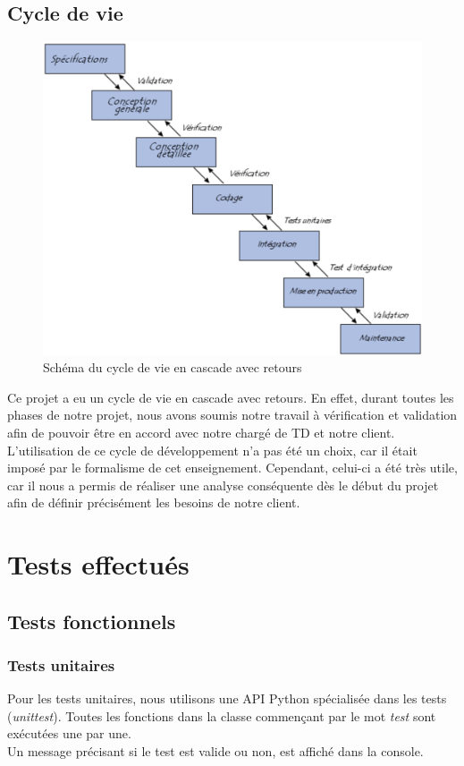 ﻿\documentclass[17pts]{report}
\begin{document}
\section{Cycle de vie}
\label{sec:Cycle de vie}
\begin{figure}[H]
    \includegraphics[scale=0.7]{./illustrations/cycle_cascade.png}
    \centering
    \caption{Schéma du cycle de vie en cascade avec retours}
    \label{fig:CycleCascade}
\end{figure}

Ce projet a eu un cycle de vie en cascade avec retours. En effet, durant toutes
les phases de notre projet, nous avons soumis notre travail à vérification et
validation afin de pouvoir être en accord avec notre chargé de TD et notre
client. L'utilisation de ce cycle de développement n'a pas été un choix, car il
était imposé par le formalisme de cet enseignement. Cependant, celui-ci a été
très utile, car il nous a permis de réaliser une analyse conséquente dès le
début du projet afin de définir précisément les besoins de notre client.

\chapter{Tests effectués}\thispagestyle{IHA-fancy-style}
\label{cha:Tests}
\section{Tests fonctionnels}
\label{sec:Tests fonctionnels}
\subsection{Tests unitaires}
\label{sub:Tests unitaires}
Pour les tests unitaires, nous utilisons une API Python spécialisée dans les
tests (\textit{unittest}). Toutes les fonctions dans la classe commençant par
le mot \textit{test} sont exécutées une par une.\\ Un message précisant si le
test est valide ou non, est affiché dans la console.\\
\end{document}

